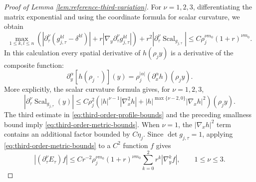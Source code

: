 \documentclass[11pt]{article}
\numberwithin{equation}{section}
\theoremstyle{remark}
\begin{document}
\begin{proof}[Proof of Lemma  \ref{lem:reference-third-variation}]
{For \(\nu=1,2,3\), differentiating the matrix exponential and
using the coordinate formula for scalar curvature, we obtain}
\begin{equation}\label{eq:third-order-metric-bounds}
 \max_{1\le k,l\le n}
 \left(
 |\partial_\tau^\nu(g_{j,\tau}^{kl}-\delta^{kl})|
 +r|\nabla_y\partial_\tau^\nu g_{j,\tau}^{kl}|
 \right)
 +r^2|\partial_\tau^\nu \operatorname{Scal}_{g_{j,\tau}}|
 \le C\rho_j^{\nu m_0}(1+r)^{\nu m_0}.
\end{equation}
In this calculation every spatial derivative of \(h(\rho_jy)\) is a
derivative of the composite function:
\[
 \partial_y^\alpha[h(\rho_j\,\cdot)](y)
 =\rho_j^{|\alpha|}(\partial_x^\alpha h)(\rho_jy).
\]
{More explicitly, the scalar curvature formula gives, for
\(\nu=1,2,3\),}
\[
 |\partial_\tau^\nu \operatorname{Scal}_{g_{j,\tau}}(y)|
 \le C\rho_j^2
 \left(
 |h|^{\nu-1}|\nabla_x^2h|
 +|h|^{\max\{\nu-2,0\}}|\nabla_xh|^2
 \right)(\rho_jy).
\]
{The third estimate in
\eqref{eq:third-order-profile-bounds} and the preceding smallness bound imply
\eqref{eq:third-order-metric-bounds}. When \(\nu=1\), the
\(|\nabla_xh|^2\) term contains an additional factor bounded by
\(C\eta_j\). Since \(\det g_{j,\tau}=1\), applying
\eqref{eq:third-order-metric-bounds} to a \(C^2\) function \(f\) gives}
\begin{equation}\label{eq:third-order-operator-bound}
 |(\partial_\tau^\nu E_\tau)f|
 \le
 Cr^{-2}\rho_j^{\nu m_0}(1+r)^{\nu m_0}
 \sum_{k=0}^2r^k|\nabla_y^kf|,
 \qquad 1\le\nu\le3.
\end{equation}


\end{proof}
\end{document}
